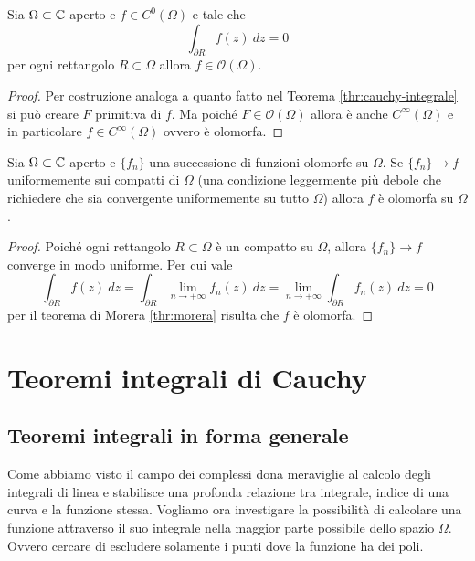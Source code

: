 \begin{theorem}[Morera]
  Sia $\Omega \subset \mathbb{C}$ aperto e $f \in C^0(\Omega)$ e tale che 
    \begin{equation*}
      \int_{\partial R} f(z)\ dz = 0 
    \end{equation*}
    per ogni rettangolo $R \subset \Omega$ allora $f \in
    \mathcal{O}(\Omega)$. 
    \label{thr:morera}
\end{theorem}
\begin{proof}
  Per costruzione analoga a quanto fatto nel Teorema
  \ref{thr:cauchy-integrale} si può creare $F$ primitiva di $f$. Ma poiché
  $F \in \mathcal{O}(\Omega)$ allora è anche $C^{\infty}(\Omega)$ e in
  particolare $f \in C^{\infty}(\Omega)$ ovvero è olomorfa. 
\end{proof}

\begin{corollary}
  Sia $\Omega \subset \mathbb{C}$ aperto e $\{f_n\}$ una successione di funzioni
  olomorfe su $\Omega$. Se $\{f_n\} \to f$ uniformemente sui compatti di
  $\Omega$ (una condizione leggermente più debole che richiedere che sia
  convergente uniformemente su tutto $\Omega$) allora $f$ è olomorfa su
  $\Omega$.  
  \label{cor:trasmissione-olomorfismo-successione}
\end{corollary}
\begin{proof}
  Poiché ogni rettangolo $R \subset \Omega$ è un compatto su $\Omega$,
  allora $\{f_n\} \to f$ converge in modo uniforme. Per cui vale
  \begin{equation*}
    \int_{\partial R} f(z)\ dz = \int_{\partial R} \lim_{n\to+\infty}f_n(z)
    \ dz = \lim_{n\to+\infty} \int_{\partial R} f_n(z)\ dz = 0 
  \end{equation*}
  per il teorema di Morera \ref{thr:morera} risulta che $f$ è olomorfa.
\end{proof}

\section{Teoremi integrali di Cauchy}
\subsection{\textcolor{AnComp}{\textbf{Teoremi integrali in forma generale}}}

Come abbiamo visto il campo dei complessi dona meraviglie al calcolo degli
integrali di linea e stabilisce una profonda relazione tra integrale, indice
di una curva e la funzione stessa. Vogliamo ora investigare la
possibilità di calcolare una funzione attraverso il suo integrale nella
maggior parte possibile dello spazio $\Omega$. Ovvero cercare di escludere
solamente i punti dove la funzione ha dei poli.

